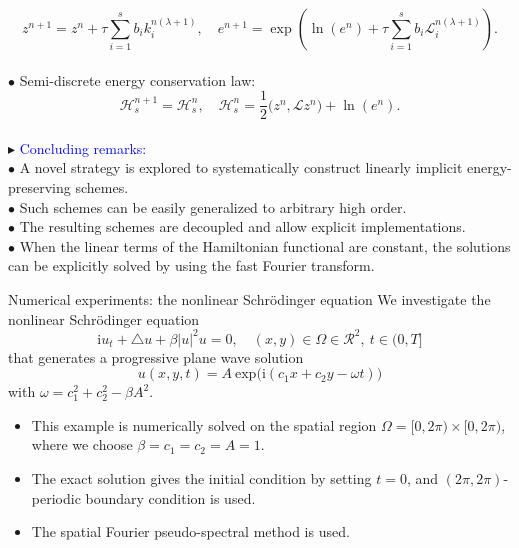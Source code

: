 \documentclass[10pt]{beamer}
\begin{document}
\begin{frame}
\begin{equation}\label{eq-46}
z^{n+1}=z^n+\tau\sum_{i=1}^sb_ik_i^{n(\lambda+1)},\quad e^{n+1}=\exp\left(\ln (e^n)+\tau\sum_{i=1}^sb_i\mathcal{L}_i^{n(\lambda+1)}\right).
\end{equation}\\
\quad\textcolor[rgb]{0,0,1}{$\bullet$} Semi-discrete energy conservation law:
\begin{equation}\label{eq-47}
\mathcal{H}_s^{n+1}=\mathcal{H}_s^n,\quad\mathcal{H}_s^n=\frac{1}{2}\big(z^n,\mathcal{L}z^n\big)+\ln (e^n).
\end{equation}\\
\textcolor[rgb]{0,0,1}{$\blacktriangleright$} \textcolor{blue}{Concluding remarks:}\\
\vspace{2mm}
\quad\textcolor[rgb]{0,0,1}{$\bullet$} A novel strategy is explored to systematically construct linearly implicit energy-preserving schemes.\\
\vspace{2mm}
\quad\textcolor[rgb]{0,0,1}{$\bullet$} Such schemes can be easily generalized to arbitrary high order.\\
\vspace{2mm}
\quad\textcolor[rgb]{0,0,1}{$\bullet$} The resulting schemes are decoupled and allow explicit implementations.\\
\vspace{2mm}
\quad\textcolor[rgb]{0,0,1}{$\bullet$} When the linear terms of the Hamiltonian functional are constant, the solutions can be explicitly solved by using the fast Fourier transform.
\end{frame}

\begin{frame}{Numerical experiments: the nonlinear Schr\"odinger equation}
We investigate the nonlinear Schr\"odinger equation
\begin{equation*}
\mbox{i}u_t+\triangle u +\beta |u|^2u=0,\quad (x,y)\in\Omega\in\mathcal{R}^2,\ t\in (0,T]
\end{equation*} 
that generates a progressive plane wave solution
\begin{equation*}
u(x,y,t)=A\ \mbox{exp}\big(\mbox{i}(c_1x+c_2y-\omega t)\big)
\end{equation*} 
with $\omega=c_1^2+c_2^2-\beta A^2$. \\
\vspace{2mm}
\begin{itemize}
\item This example is numerically solved on the spatial region $\Omega=[0,2\pi)\times[0,2\pi)$, where we choose $\beta=c_1=c_2=A=1$. 
\item The exact solution gives the initial condition by setting $t=0$, and $(2\pi,2\pi)$-periodic boundary condition is used. 	
\item The spatial Fourier pseudo-spectral method is used.
\end{itemize}
\end{frame}
\end{document}
